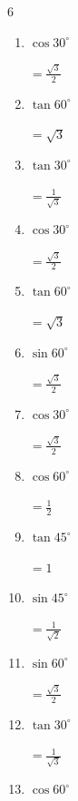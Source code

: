 \begin{multicols}{6}
\begin{enumerate}
        $\displaystyle =\frac{1}{\sqrt{2}}$

  \item $\displaystyle \cos{30^\circ}$

        $\displaystyle =\frac{\sqrt{3}}{2}$

  \item $\displaystyle \tan{60^\circ}$

        $\displaystyle =\sqrt{3}$

  \item $\displaystyle \tan{30^\circ}$

        $\displaystyle =\frac{1}{\sqrt{3}}$

\columnbreak %

  \item $\displaystyle \cos{30^\circ}$

        $\displaystyle =\frac{\sqrt{3}}{2}$

  \item $\displaystyle \tan{60^\circ}$

        $\displaystyle =\sqrt{3}$

  \item $\displaystyle \sin{60^\circ}$

        $\displaystyle =\frac{\sqrt{3}}{2}$

  \item $\displaystyle \cos{30^\circ}$

        $\displaystyle =\frac{\sqrt{3}}{2}$

  \item $\displaystyle \cos{60^\circ}$

        $\displaystyle =\frac{1}{2}$

  \item $\displaystyle \tan{45^\circ}$

        $\displaystyle =1$

  \item $\displaystyle \sin{45^\circ}$

        $\displaystyle =\frac{1}{\sqrt{2}}$

  \item $\displaystyle \sin{60^\circ}$

        $\displaystyle =\frac{\sqrt{3}}{2}$

  \item $\displaystyle \tan{30^\circ}$

        $\displaystyle =\frac{1}{\sqrt{3}}$

  \item $\displaystyle \cos{60^\circ}$


\end{enumerate}
\end{multicols}
